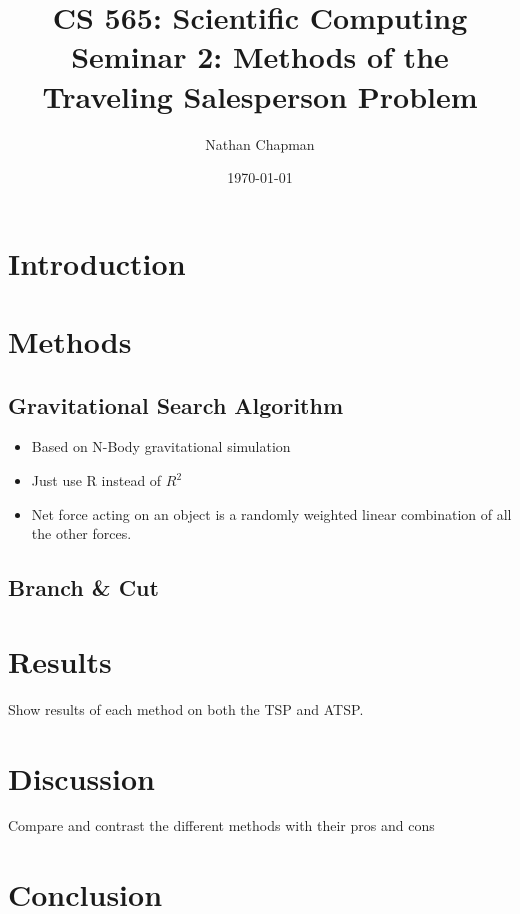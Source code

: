 \documentclass{article}
\title{\vspace*{-0.625in}CS 565: Scientific Computing \\ Seminar 2: Methods of the Traveling Salesperson Problem}
\author{Nathan Chapman}
\date{\today}
\begin{document}
    \maketitle

    \section*{Introduction}

    \section*{Methods}

        \subsection*{Gravitational Search Algorithm}

            \begin{itemize}
                \item Based on N-Body gravitational simulation
                \item Just use R instead of $R^2$
                \item Net force acting on an object is a randomly weighted linear combination of all the other forces.
            \end{itemize}

        \subsection*{Branch \& Cut}

    \section*{Results}

        Show results of each method on both the TSP and ATSP.

    \section*{Discussion}

        Compare and contrast the different methods with their pros and cons

    \section*{Conclusion}
\end{document}
